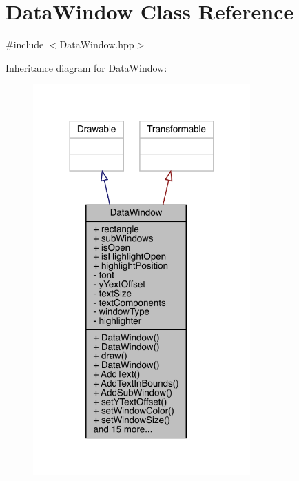 \hypertarget{class_data_window}{}\section{Data\+Window Class Reference}
\label{class_data_window}


{\ttfamily \#include $<$Data\+Window.\+hpp$>$}



Inheritance diagram for Data\+Window\+:
\nopagebreak
\begin{figure}[H]
\begin{center}
\leavevmode
\includegraphics[width=236pt]{d5/d6e/class_data_window__inherit__graph}
\end{center}
\end{figure}


